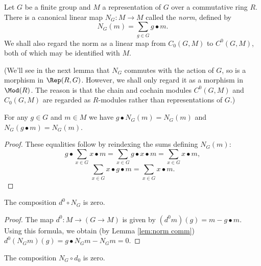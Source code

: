 \begin{definition} \label{def:norm}
	\leanok
	Let $G$ be a finite group and $M$ a representation of $G$ over a commutative ring $R$.
	There is a canonical linear map $N_G : M \to M$ called the \emph{norm},
	defined by
	\[
		N_G(m) = \sum_{g \in G} g \bullet m.
	\]
	We shall also regard the norm as a linear map from $C_0(G,M)$ to $C^0(G,M)$, both of which may
	be identified with $M$.

	(We'll see in the next lemma that $N_G$ commutes with the action of $G$,
	so is a morphism in $\Rep(R,G)$. However, we shall only regard it as a morphism in $\Mod(R)$.
	The reason is that the chain and cochain modules $C^0(G,M)$ and
	$C_0(G,M)$ are regarded as $R$-modules rather than representations of $G$.)
\end{definition}

\begin{lemma}	\label{lem:norm comm}
	\leanok
	For any $g \in G$ and $m \in M$ we have $g \bullet N_G (m) = N_G (m)$
	and $N_G (g \bullet m) = N_G (m)$.
\end{lemma}

\begin{proof}
	\leanok
	These equalities follow by reindexing the sums defining $N_G (m)$:
	\[
		g \bullet \sum_{x \in G} x \bullet m
		= \sum_{x \in G} g \bullet x \bullet m
		= \sum_{x \in G} x \bullet m,
	\]
	\[
		\sum_{x \in G} x \bullet g \bullet m
		= \sum_{x \in G} x \bullet m.
	\]
\end{proof}

\begin{lemma}	\label{lem:norm comp d}
	\leanok
	The composition $d^0 \circ N_G$ is zero.
\end{lemma}

\begin{proof}
	\leanok
	The map $d^0 : M \to (G \to M)$ is given by
	$(d^0 m)(g) = m - g\bullet m$.
	Using this formula, we obtain (by Lemma \ref{lem:norm comm})
	$d^0 (N_G m) (g) = g \bullet N_G m - N_G m = 0$.
\end{proof}

\begin{lemma}	\label{lem:d comp norm}
	\leanok
	The composition $N_G \circ d_0$ is zero.
\end{lemma}

